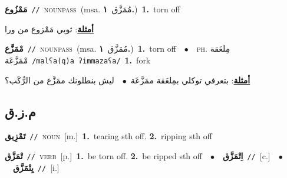 \documentclass[10pt,a4paper,twoside]{article} %
\begin{document}
\begin{multicols}{2}
{\setlength\topsep{0pt}\textbf{\foreignlanguage{arabic}{مَمْزُوع}}\ {\color{gray}\texttt{//}\color{black}}\ \textsc{noun\textunderscore pass}\ \color{gray}(msa. \foreignlanguage{arabic}{مُمَزَّق}~\foreignlanguage{arabic}{\textbf{١.}})\color{black}\ \textbf{1.}~torn off\  \begin{flushright}\color{gray}\foreignlanguage{arabic}{\textbf{\underline{\foreignlanguage{arabic}{أمثلة}}}: ثوبي مَمْزوع من ورا}\end{flushright}\color{black}} \vspace{2mm}

{\setlength\topsep{0pt}\textbf{\foreignlanguage{arabic}{مْمَزَّع}}\ {\color{gray}\texttt{//}\color{black}}\ \textsc{noun\textunderscore pass}\ \color{gray}(msa. \foreignlanguage{arabic}{مُمَزَّق}~\foreignlanguage{arabic}{\textbf{١.}})\color{black}\ \textbf{1.}~torn off\ \ $\bullet$\ \ \textsc{ph.} \color{gray} \foreignlanguage{arabic}{مِلعَقة مْمَزَّعَة}\color{black}\ {\color{gray}\texttt{/{\sffamily malʕa(q)a ʔimmazaʕa}/}\color{black}}\ \textbf{1.}~fork\  \begin{flushright}\color{gray}\foreignlanguage{arabic}{\textbf{\underline{\foreignlanguage{arabic}{أمثلة}}}: بتعرفي توكلي بمِلعَقة ممَزَّعَة\ $\bullet$\ \  ليش بنطلونك ممَزَّع من الرُّكَب؟}\end{flushright}\color{black}} \vspace{2mm}

\vspace{-3mm}
\subsection*{\color{blue}\foreignlanguage{arabic}{م.ز.ق}\color{blue}{}} 

{\setlength\topsep{0pt}\textbf{\foreignlanguage{arabic}{تَمْزِيق}}\ {\color{gray}\texttt{//}\color{black}}\ \textsc{noun}\ [m.]\ \textbf{1.}~tearing sth off.  \textbf{2.}~ripping sth off\ } \vspace{2mm}

{\setlength\topsep{0pt}\textbf{\foreignlanguage{arabic}{تْمَزَّق}}\ {\color{gray}\texttt{//}\color{black}}\ \textsc{verb}\ [p.]\ \textbf{1.}~be torn off.  \textbf{2.}~be ripped sth off\ \ $\bullet$\ \ \setlength\topsep{0pt}\textbf{\foreignlanguage{arabic}{اِتْمَزَّق}}\ {\color{gray}\texttt{//}\color{black}}\ [c.]\ \ $\bullet$\ \ \setlength\topsep{0pt}\textbf{\foreignlanguage{arabic}{يِتْمَزَّق}}\ {\color{gray}\texttt{//}\color{black}}\ [i.]\ } \vspace{2mm}


\end{multicols}
\end{document}

